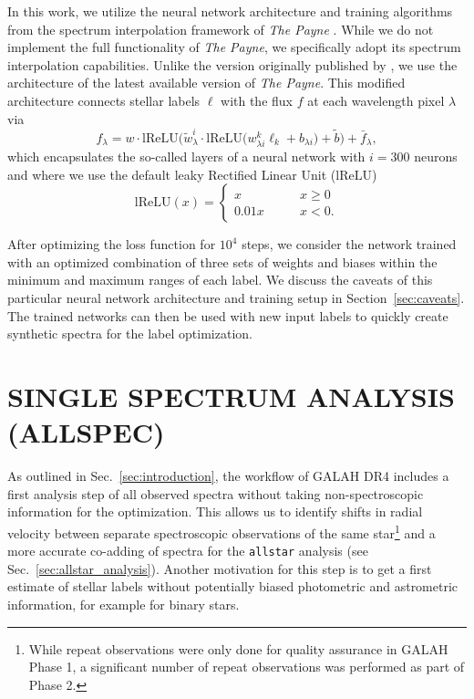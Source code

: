 \documentclass[
  journal=pasa,
  manuscript=research-paper, %
  year=2024,
  volume=37
]{cup-journal}
\begin{document}
In this work, we utilize the neural network architecture and training algorithms from the spectrum interpolation framework of \textit{The Payne} \citep{Ting2019}. While we do not implement the full functionality of \textit{The Payne}, we specifically adopt its spectrum interpolation capabilities. Unlike the version originally published by \citet{Ting2019}, we use the architecture of the latest available version of \textit{The Payne}. This modified architecture connects stellar labels $\boldsymbol{\ell}$ with the flux $f$ at each wavelength pixel $\lambda$ via
\begin{equation}
f_\lambda = w \cdot \mathrm{lReLU} \bigg( \tilde{w}_\lambda^i \cdot \mathrm{lReLU}  \Big( w^k_{\lambda i} \ell_k + b_{\lambda i} \Big) + \tilde{b} \bigg) + \bar{f}_\lambda,
\label{eq:neural_network_function}
\end{equation}
which encapsulates the so-called layers of a neural network with $i = 300$ neurons and where we use the default leaky Rectified Linear Unit ($\mathrm{lReLU}$)
\begin{equation}
    \mathrm{lReLU} (x) =  \begin{cases}
        x \qquad &x \geq 0 \\
        0.01 x \qquad &x < 0.
    \end{cases}
\end{equation}

After optimizing the loss function for $10^4$ steps, we consider the network trained with an optimized combination of three sets of weights and biases within the minimum and maximum ranges of each label. We discuss the caveats of this particular neural network architecture and training setup in Section~\ref{sec:caveats}. The trained networks can then be used with new input labels to quickly create synthetic spectra for the label optimization.

\section{SINGLE SPECTRUM ANALYSIS (ALLSPEC)}
\label{sec:allspec_analysis}

As outlined in Sec.~\ref{sec:introduction}, the workflow of GALAH DR4 includes a first analysis step of all observed spectra without taking non-spectroscopic information for the optimization. This allows us to identify shifts in radial velocity between separate spectroscopic observations of the same star\footnote{While repeat observations were only done for quality assurance in GALAH Phase 1, a significant number of repeat observations was performed as part of Phase 2.} and a more accurate co-adding of spectra for the \texttt{allstar} analysis (see Sec.~\ref{sec:allstar_analysis}). Another motivation for this step is to get a first estimate of stellar labels without potentially biased photometric and astrometric information, for example for binary stars.
\end{document}
